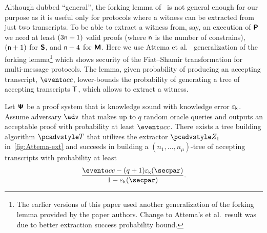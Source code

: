 Although dubbed ``general'', the forking lemma of~\cite{CCS:BelNev06} is not general
enough for our purpose as it is useful only for protocols where a witness can be
extracted from just two transcripts. To be able to extract a witness from, say, an
execution of $\bm{\mathsf{P}}$ we need at least $(3 \mathsf{n} + 1)$ valid proofs
(where $\mathsf{n}$ is the number of constrains),
$(\mathsf{n}+ 1)$ for $\bm{\mathsf{S}}$, and $\mathsf{n} + 4$ for $\bm{\mathsf{M}}$. Here we use Attema et
al.~\cite{EPRINT:AttFehKlo21} generalization of the forking lemma\footnote{The
	earlier versions of this paper used another generalization of the forking lemma
	provided by the paper authors. Change to Attema's et al.~result was due to better
	extraction success probability bound.}  which shows security of the Fiat--Shamir
transformation for multi-message protocols. The lemma, given probability of producing
an accepting transcript, $\accProb$, lower-bounds the probability of generating a
tree of accepting transcripts $\mathsf{T}$, which allows to extract a witness.

\begin{lemma}\label{lemma:Attema}
	 Let $\bm{\mathsf{\Psi}}$ be a proof system that is knowledge sound
	with knowledge error $\varepsilon_{\mathsf{k}}$. Assume adversary $\adv$ that makes up to $q$ random
	oracle queries and outputs an acceptable proof with probability at least
	$\accProb$. There exists a tree building algorithm $\tdv$ that utilizes the extractor $\zdv_1$ in~\cref{fig:Attema-ext} and succeeds in building a
	$(n_1, \ldots, n_\mu)$-tree of accepting transcripts  with probability at least
	\[
	\frac{\accProb - (q + 1) \epsk (\secpar)}{1 - \epsk (\secpar)}.
	\]
	\end{lemma}

